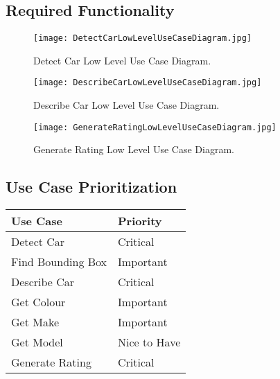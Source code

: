 \subsection{Required Functionality}
\begin{figure}[h!]
  \caption{Detect Car Low Level Use Case Diagram.}
  \centering
	\texttt{[image: DetectCarLowLevelUseCaseDiagram.jpg]}
\end{figure}

\begin{figure}[h!]
  \caption{Describe Car Low Level Use Case Diagram.}
  \centering
	\texttt{[image: DescribeCarLowLevelUseCaseDiagram.jpg]}
\end{figure}

\begin{figure}[h!]
  \caption{Generate Rating Low Level Use Case Diagram.}
  \centering
	\texttt{[image: GenerateRatingLowLevelUseCaseDiagram.jpg]}
\end{figure}

\subsection{Use Case Prioritization}
\begin{tabular}{| l | l |}
	\hline
	Use Case & Priority \\
	\hline
	Detect Car & Critical \\
	Find Bounding Box & Important \\
	Describe Car & Critical \\
	Get Colour & Important \\	
	Get Make & Important \\
	Get Model & Nice to Have \\
	Generate Rating & Critical \\
	\hline
\end{tabular}

